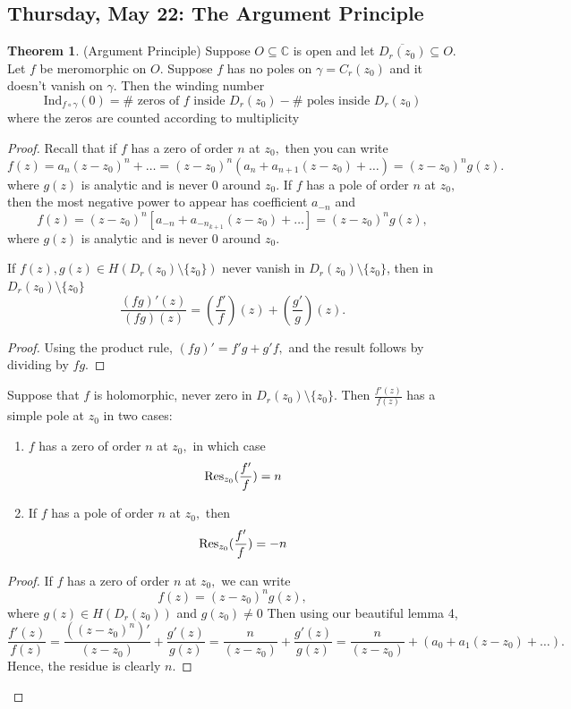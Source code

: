 \documentclass[10pt, oneside]{article}
\newcommand{\bbC}{\mathbb{C}}
\newcommand{\Ind}{\text{Ind}}
\newcommand{\sm}{\setminus}
\theoremstyle{definition}
\newtheorem{thm}{Theorem}
\begin{document}
\newpage
\subsection{Thursday, May 22: The Argument Principle}
\begin{thm}
    (Argument Principle) Suppose $O\subseteq \bbC$ is open and let $\overline{D_r(z_0)}\subseteq O.$ Let $f$ be meromorphic on $O.$ Suppose $f$ has no poles on $\gamma = C_r(z_0)$ and it doesn't vanish on $\gamma.$ Then the winding number 
    \[\Ind_{f\circ \gamma}(0) = \#\text{ zeros of $f$ inside } D_{r}(z_0) - \# \text{ poles inside $D_{r}(z_0)$}\] where the zeros are counted according to multiplicity
\end{thm}
\begin{proof}
    Recall that if $f$ has a zero of order $n$ at $z_0,$ then you can write 
    \[f(z) = a_n(z-z_0)^n+ \dots = (z-z_0)^n (a_n+ a_{n+1}(z-z_0) + \dots)= (z-z_0)^ng(z).\] where $g(z)$ is analytic and is never $0$ around $z_0.$ If $f$ has a pole of order $n$ at $z_0,$ then the most negative power to appear has coefficient $a_{-n}$ and 
    \[f(z) = (z-z_0)^n\left[a_{-n}+ a_{-n_{k+1}}(z-z_0) + \dots\right]= (z-z_0)^n g(z),\] where $g(z)$ is analytic and is never $0$ around $z_0.$ 
    \begin{lemma}
        If $f(z), g(z)\in H(D_r(z_0)\sm \{z_0\})$ never vanish in $D_r(z_0)\sm \{z_0\}$, then in $D_r(z_0)\sm\{z_0\}$
        \[\frac{(f g)'(z)}{(f g)(z)} = (\frac{f'}{f})(z) + (\frac{g'}{g})(z).\]
    \end{lemma}
    \begin{proof}
        Using the product rule, $(fg)' = f'g + g'f,$ and the result follows by dividing by $fg.$ 
    \end{proof}
    \begin{lemma}
        Suppose that $f$ is holomorphic, never zero in 
        $D_r(z_0)\sm \{z_0\}.$ Then $\frac{f'(z)}{f(z)}$ has a simple pole at $z_0$ in two cases:
        \begin{enumerate}
            \item $f$ has a zero of order $n$ at $z_0,$ in which case 
            \[\Res_{z_0}(\frac{f'}{f}) = n\]
            \item If $f$ has a pole of order $n$ at $z_0,$ then 
            \[\Res_{z_0}(\frac{f'}{f}) = -n\]
        \end{enumerate}
    \end{lemma}
    \begin{proof}
        If $f$ has a zero of order $n$ at $z_0,$ we can write 
        \[f(z) = (z- z_0)^n g(z),\] where $g(z) \in H(D_r(z_0))$ and $g(z_0)\neq 0$ Then using our beautiful lemma 4,
        \[\frac{f'(z)}{f(z)}= \frac{\left((z - z_0)^n\right)'}{(z-z_0)} + \frac{g'(z)}{g(z)}= \frac{n}{(z-z_0)} + \frac{g'(z)}{g(z)} = \frac{n}{(z-z_0)} + (a_0 + a_1(z-z_0) + \dots).\] Hence, the residue is clearly $n.$


\end{proof}
\end{proof}
\end{document}
